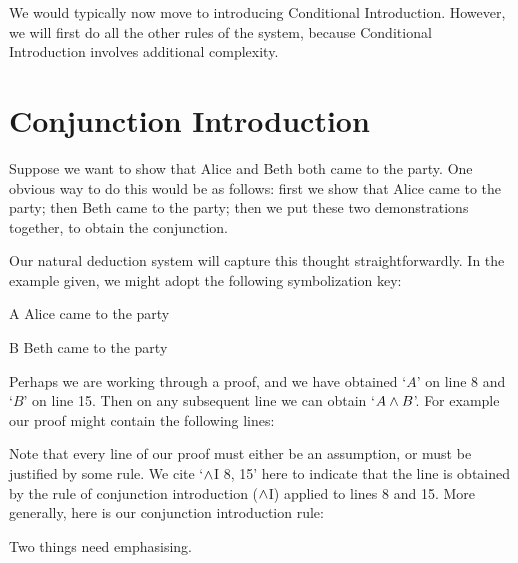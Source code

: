 We would typically now move to introducing Conditional Introduction. However, we will first do all the other rules of the system, because Conditional Introduction involves additional complexity.

\section{Conjunction Introduction}
Suppose we want to show that Alice and Beth both came to the party. One obvious way to do this would be as follows: first we show that Alice came to the party; then Beth came to the party; then we put these two demonstrations together, to obtain the conjunction.

Our natural deduction system will capture this thought straightforwardly. In the example given, we might adopt the following symbolization key:
	\begin{ekey}
		\item[A] Alice came to the party
		\item[B] Beth came to the party
	\end{ekey}
Perhaps we are working through a proof, and we have obtained `$A$' on line 8 and `$B$' on line 15. Then on any subsequent line we can obtain `$A \mathbin{\wedge} B$'. For example our proof might contain the following lines:
\begin{pf}
	\hspace*{1em}
	\hspace*{1em}
	 \hspace*{1em}
\end{pf}
Note that every line of our proof must either be an assumption, or must be justified by some rule. We cite `$\mathbin{\wedge}$I 8, 15' here to indicate that the line is obtained by the rule of conjunction introduction ($\mathbin{\wedge}$I) applied to lines 8 and 15.
More generally, here is our conjunction introduction rule:


Two things need emphasising.

